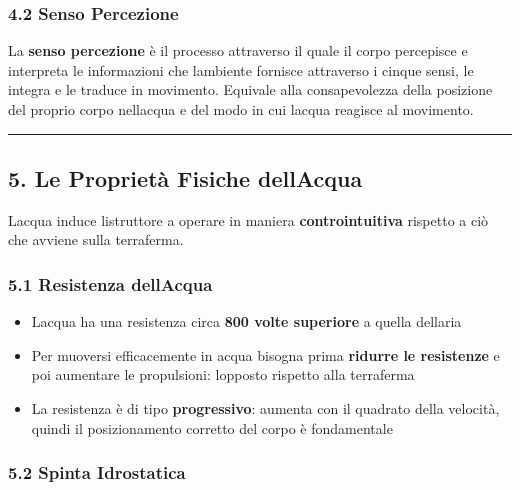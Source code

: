 \documentclass[a4paper,11pt]{article}
\providecommand{\tightlist}{%
  \setlength{\itemsep}{0pt}\setlength{\parskip}{0pt}}
\begin{document}
\subsubsection{4.2 Senso Percezione}\label{senso-percezione}

La \textbf{senso percezione} è il processo attraverso il quale il corpo
percepisce e interpreta le informazioni che l\textquotesingle ambiente
fornisce attraverso i cinque sensi, le integra e le traduce in
movimento. Equivale alla consapevolezza della posizione del proprio
corpo nell\textquotesingle acqua e del modo in cui
l\textquotesingle acqua reagisce al movimento.

\begin{center}\rule{0.5\linewidth}{0.5pt}\end{center}

\subsection{5. Le Proprietà Fisiche
      dell\textquotesingle Acqua}\label{le-proprietuxe0-fisiche-dellacqua}

L\textquotesingle acqua induce l\textquotesingle istruttore a operare in
maniera \textbf{controintuitiva} rispetto a ciò che avviene sulla
terraferma.

\subsubsection{5.1 Resistenza
      dell\textquotesingle Acqua}\label{resistenza-dellacqua}

\begin{itemize}
      \tightlist
      \item
            L\textquotesingle acqua ha una resistenza circa \textbf{800 volte
                  superiore} a quella dell\textquotesingle aria
      \item
            Per muoversi efficacemente in acqua bisogna prima \textbf{ridurre le
                  resistenze} e poi aumentare le propulsioni: l\textquotesingle opposto
            rispetto alla terraferma
      \item
            La resistenza è di tipo \textbf{progressivo}: aumenta con il quadrato
            della velocità, quindi il posizionamento corretto del corpo è
            fondamentale
\end{itemize}

\subsubsection{5.2 Spinta Idrostatica}\label{spinta-idrostatica}
\end{document}
